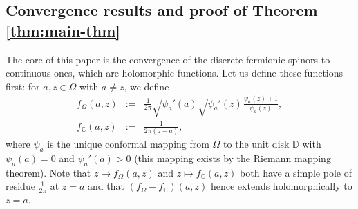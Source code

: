\documentclass[oneside,english]{amsart}
\numberwithin{equation}{section}
\numberwithin{figure}{section}
\theoremstyle{plain}
\theoremstyle{plain}
\theoremstyle{plain}
\theoremstyle{plain}
\theoremstyle{plain}
\theoremstyle{definition}
\theoremstyle{remark}
\begin{document}
\subsection{\label{sub:convergence-results}Convergence results and proof of
Theorem \ref{thm:main-thm}}

The core of this paper is the convergence of the discrete fermionic
spinors to continuous ones, which are holomorphic functions. Let us
define these functions first: for $a,z\in\Omega$ with $a\neq z$,
we define
\begin{eqnarray*}
f_{\Omega}\left(a,z\right) & := & \frac{1}{2\pi}\sqrt{\psi_{a}'\left(a\right)}\sqrt{\psi_{a}'\left(z\right)}\frac{\psi_{a}\left(z\right)+1}{\psi_{a}\left(z\right)},\\
f_{\mathbb{C}}\left(a,z\right) & := & \frac{1}{2\pi\left(z-a\right)},
\end{eqnarray*}
where $\psi_{a}$ is the unique conformal mapping from $\Omega$ to
the unit disk $\mathbb{D}$ with $\psi_{a}\left(a\right)=0$ and $\psi_{a}'\left(a\right)>0$
(this mapping exists by the Riemann mapping theorem). Note that $z\mapsto f_{\Omega}\left(a,z\right)$
and $z\mapsto f_{\mathbb{C}}\left(a,z\right)$ both have a simple
pole of residue $\frac{1}{2\pi}$ at $z=a$ and that $\left(f_{\Omega}-f_{\mathbb{C}}\right)\left(a,z\right)$
hence extends holomorphically to $z=a$.
\end{document}
